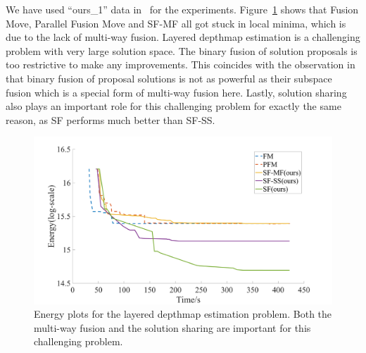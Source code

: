 
\noindent We have used ``ours\_1'' data in~\cite{layered_depthmap} for
the experiments. Figure~\ref{fig:layered_depthmap_convergence} shows
that Fusion Move, Parallel Fusion Move and SF-MF all got stuck in local
minima, which is due to the lack of multi-way fusion.  Layered depthmap
estimation is a challenging problem with very large solution space. The
binary fusion of solution proposals is too restrictive to make any
improvements.  This coincides with the observation in
\cite{layered_depthmap} that binary fusion of proposal solutions is not
as powerful as their subspace fusion which is a special form of
multi-way fusion here. Lastly, solution sharing also plays an important
role for this challenging problem for exactly the same reason, as SF
performs much better than SF-SS.

\begin{figure}[!h]
  \centering
  \includegraphics[width=0.8\columnwidth]{figure/layered_depthmap_convergence.png}
  \caption{Energy plots for the layered depthmap estimation
    problem. Both the multi-way fusion and the solution sharing are important
    for this challenging problem.}\label{fig:layered_depthmap_convergence}
\end{figure}

